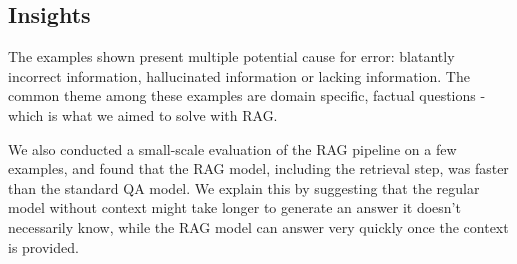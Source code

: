 \documentclass[12pt]{article}
\begin{document}
\subsection{Insights}


The examples shown present multiple potential cause for error: blatantly incorrect information, hallucinated information or lacking information.
The common theme among these examples are domain specific, factual questions - which is what we aimed to solve with RAG.

We also conducted a small-scale evaluation of the RAG pipeline on a few examples, and found that the RAG model, including the retrieval step, was faster than the standard QA model. 
We explain this by suggesting that the regular model without context might take longer to generate an answer it doesn't necessarily know, while the RAG model can answer very quickly once the context is provided.




\end{document}

